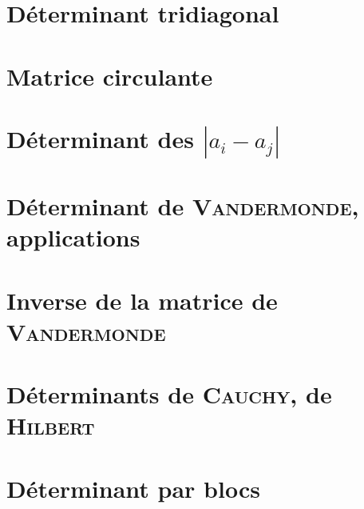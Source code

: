 \newpage

\section{Déterminant tridiagonal}


\section{Matrice circulante}


\section{Déterminant des \texorpdfstring{$|a_i - a_j|$}{|a_i - a_j|}}


\section{Déterminant de \textsc{Vandermonde}, applications}


\section{Inverse de la matrice de {\textsc{Vandermonde}}}


\section{Déterminants de \textsc{Cauchy}, de \textsc{Hilbert}}


\section{Déterminant par blocs}
